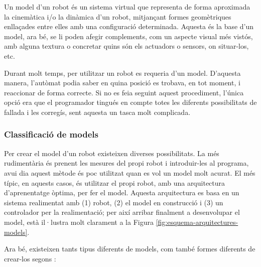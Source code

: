 \documentclass[12pt,a4paper,final,twoside]{report}
\begin{document}
Un model d'un robot és un sistema virtual que representa de forma aproximada la cinemàtica i/o la dinàmica d'un robot, mitjançant formes geomètriques enllaçades entre elles amb una configuració determinada. Aquesta és la base d'un model, ara bé, se li poden afegir complements, com un aspecte visual més vistós, amb alguna textura o concretar quins són els actuadors o sensors, on situar-los, etc.

Durant molt temps, per utilitzar un robot es requeria d'un model. D'aquesta manera, l'autòmat podia saber en quina posició es trobava, en tot moment, i reaccionar de forma correcte. Si no es feia seguint aquest procediment, l'única opció era que el programador tingués en compte totes les diferents possibilitats de fallada i les corregís, sent aquesta un tasca molt complicada.  

\subsubsection{Classificació de models}

Per crear el model d'un robot existeixen diverses possibilitats. La més rudimentària és prenent les mesures del propi robot i introduir-les al programa, avui dia aquest mètode és poc utilitzat quan es vol un model molt acurat. El més típic, en aquests casos, és utilitzar el propi robot, amb una arquitectura d'aprenentatge òptima, per fer el model. Aquesta arquitectura es basa en un sistema realimentat amb (1) robot, (2) el model en construcció i (3) un controlador per la realimentació; per així arribar finalment a desenvolupar el model,  està il·lustra molt clarament a la Figura \ref{fig:esquema-arquitectures-models}.

Ara bé, existeixen tants tipus diferents de models, com també formes diferents de crear-los segons \cite{Nguyen-Tuong2011}:
\end{document}
